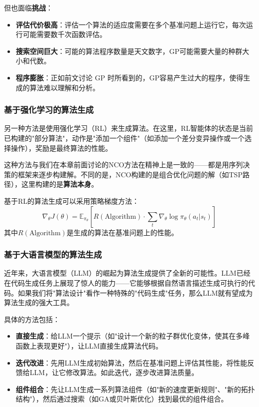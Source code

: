 \documentclass[lang=cn,zihao=-4,a4paper,fontset=windows]{beautybook}
\begin{document}
但也面临\textbf{挑战}：
\begin{itemize}
    \item \textbf{评估代价极高}：评估一个算法的适应度需要在多个基准问题上运行它，每次运行可能需要数千次函数评估。
    \item \textbf{搜索空间巨大}：可能的算法程序数量是天文数字，GP可能需要大量的种群大小和代数。
    \item \textbf{程序膨胀}：正如前文讨论 GP 时所看到的，GP容易产生过大的程序，使得生成的算法难以理解和分析。
\end{itemize}

\subsubsection{基于强化学习的算法生成}

另一种方法是使用强化学习（RL）来生成算法。在这里，RL智能体的状态是当前已构建的"部分算法"，动作是"添加一个组件"（如添加一个差分变异操作或一个选择操作），奖励是最终算法的性能。

这种方法与我们在本章前面讨论的NCO方法在精神上是一致的——都是用序列决策的框架来逐步构建解。不同的是，NCO构建的是组合优化问题的解（如TSP路径），这里构建的是\textbf{算法本身}。

基于RL的算法生成可以采用策略梯度方法：
\[
\nabla_\theta J(\theta) = \mathbb{E}_{\pi_\theta}\left[ R(\text{Algorithm}) \cdot \sum_{t} \nabla_\theta \log \pi_\theta(a_t | s_t) \right]
\]
其中$R(\text{Algorithm})$是生成的算法在基准问题上的性能。

\subsubsection{基于大语言模型的算法生成}

近年来，大语言模型（LLM）的崛起为算法生成提供了全新的可能性。LLM已经在代码生成任务上展现了惊人的能力——它能够根据自然语言描述生成可执行的代码。如果我们将"算法设计"看作一种特殊的"代码生成"任务，那么LLM就有望成为算法生成的强大工具。

具体的方法包括：
\begin{itemize}
    \item \textbf{直接生成}：给LLM一个提示（如"设计一个新的粒子群优化变体，使其在多峰函数上表现更好"），让LLM直接生成算法代码。
    \item \textbf{迭代改进}：先用LLM生成初始算法，然后在基准问题上评估其性能，将性能反馈给LLM，让它修改算法。如此迭代，逐步改进算法质量。
    \item \textbf{组件组合}：先让LLM生成一系列算法组件（如"新的速度更新规则"、"新的拓扑结构"），然后通过搜索（如GA或贝叶斯优化）找到最优的组件组合。
\end{itemize}
\end{document}
